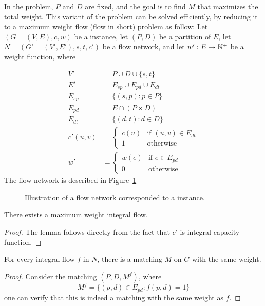 \label{sub:fixed}
In the \textsc{\FIXEDCARPOOL{}} problem, $P$ and $D$ are fixed, 
and the goal is to find $M$ that maximizes the total weight. 
This variant of the problem can be solved efficiently,
by reducing it to a maximum weight flow (flow in short) problem as
follow:
Let $(G = (V, E), c, w)$ be a \CARPOOL{} instance,
let $(P, D)$ be a partition of $E$,
let  $N = (G' = (V', E'), s, t, c')$ be a flow network, 
and let $w' : E \rightarrow \mathbb{N}^+$ be a weight function, where 

\begin{align*}
V'			& = P \cup D \cup \{s, t\}										\\
E'			& = E_{sp} \cup E_{pd} \cup E_{dt}								\\
E_{sp}		& =	\{(s, p) : p \in P \}										\\
E_{pd}		& =	E \cap (P \times D)											\\
E_{dt}		& =	\{(d, t) : d \in D \}										\\
c'(u, v)	& = 
				\begin{cases}
				c(u) & \text{if } (u, v) \in E_{dt} 						\\
				1 & \text{otherwise}
				\end{cases}
																			\\
w'			& = 
				\begin{cases}
				w(e) & \text{if } e \in E_{pd} 								\\
				0 & \text{otherwise}	
				\end{cases}
\end{align*}
The flow network is described in Figure~\ref{fig:flow}
\begin{figure}
\centering

\caption{
\label{fig:flow}
Illustration of a flow network corresponded to a \FIXEDCARPOOL{} instance.}
\end{figure}

\begin{lemma}
There exists a maximum weight integral flow.
\end{lemma}

\begin{proof}
The lemma follows directly from the fact that $c'$ is integral capacity function.
\end{proof}

\begin{lemma}
For every integral flow $f$ in $N$, there is a matching $M$ on $G$ with the same weight. 
\end{lemma}

\begin{proof}
Consider the matching $(P, D, M^f)$, where 
$$ M^f = \{(p, d) \in E_{pd} : f(p, d) = 1\} $$
one can verify that this is indeed a matching with the same weight as $f$.
\end{proof}

